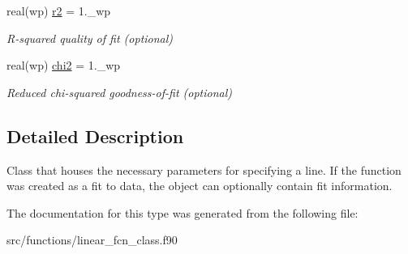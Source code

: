 \begin{DoxyCompactItemize}
real(wp) \hyperlink{structlinear__fcn__class_1_1linear__fcn__t_a7921c087d4d7339b5443696c6f6f4102}{r2} = 1.\+\_\+wp
\begin{DoxyCompactList}\small\item\em R-\/squared quality of fit (optional) \end{DoxyCompactList}\item 
\hypertarget{structlinear__fcn__class_1_1linear__fcn__t_a4b7cc61e2cf978a400903b9bb81f0e85}{}\label{structlinear__fcn__class_1_1linear__fcn__t_a4b7cc61e2cf978a400903b9bb81f0e85} 
real(wp) \hyperlink{structlinear__fcn__class_1_1linear__fcn__t_a4b7cc61e2cf978a400903b9bb81f0e85}{chi2} = 1.\+\_\+wp
\begin{DoxyCompactList}\small\item\em Reduced chi-\/squared goodness-\/of-\/fit (optional) \end{DoxyCompactList}\end{DoxyCompactItemize}


\subsection{Detailed Description}
Class that houses the necessary parameters for specifying a line. If the function was created as a fit to data, the object can optionally contain fit information. 

The documentation for this type was generated from the following file\+:\begin{DoxyCompactItemize}
\item 
src/functions/linear\+\_\+fcn\+\_\+class.\+f90\end{DoxyCompactItemize}
